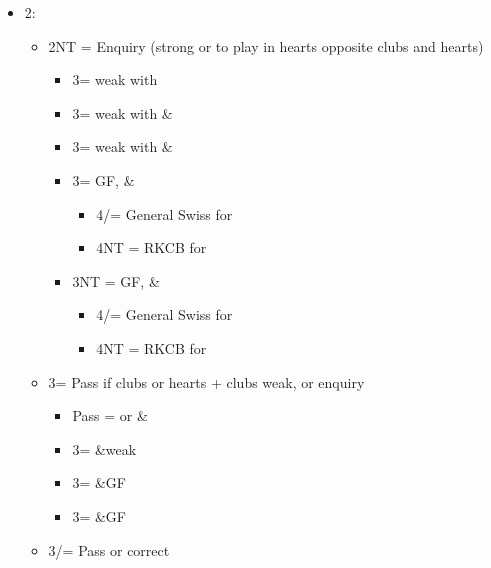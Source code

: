 \documentclass[a4paper,14pt]{extarticle}
\begin{document}
\begin{itemize}
\newpage

\item 2\spades:
	\begin{itemize}
   \item 2NT = Enquiry (strong or to play in hearts opposite clubs and hearts)
		\begin{itemize}
      \item 3\clubs = weak with \clubs
      \item 3\diamonds = weak with \hearts\&\diamonds
      \item 3\hearts = weak with \hearts\&\clubs
      \item 3\spades = GF, \hearts\&\clubs
			\begin{itemize}
			\item 4\clubs/\diamonds = General Swiss for \clubs ~
			\item 4NT = RKCB for \hearts ~
			\end{itemize}
      \item 3NT = GF, \hearts\&\diamonds
			\begin{itemize}
			\item 4\clubs/\diamonds = General Swiss for \diamonds ~
			\item 4NT = RKCB for \hearts ~
			\end{itemize}
		\end{itemize}
	\item 3\clubs = Pass if clubs or hearts + clubs weak, or enquiry
		\begin{itemize}
		\item Pass = \clubs or \hearts\&\clubs
		\item 3\diamonds = \hearts\&\diamonds weak
		\item 3\hearts = \hearts\&\clubs GF
		\item 3\spades = \hearts\&\diamonds GF
		\end{itemize}
   \item 3\diamonds/\hearts = Pass or correct
	\end{itemize}


\end{itemize}
\end{document}

